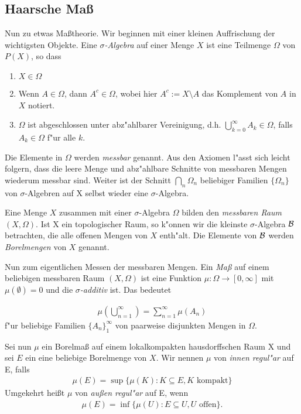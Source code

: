 \subsection{Haarsche Maß}
	Nun zu etwas Maßtheorie. Wir beginnen mit einer kleinen Auffrischung der wichtigsten Objekte. Eine \emph{$\sigma$-Algebra} auf einer Menge $X$ ist eine Teilmenge $\Omega$ von $P(X)$, so dass
	\begin{enumerate}[label=(\roman*)]
		\item $X \in \Omega$
		\item Wenn $A \in \Omega$, dann $A^c \in \Omega$, wobei hier $A^c := X\setminus A$ das Komplement von $A$ in $X$ notiert.
		\item $\Omega$ ist abgeschlossen unter abz"ahlbarer Vereinigung, d.h. $\bigcup_{k=0}^{\infty} A_k \in \Omega$, falls $A_k \in \Omega$ f"ur alle $k$.
	\end{enumerate}
	Die Elemente in $\Omega$ werden \emph{messbar} genannt. Aus den Axiomen l"asst sich leicht folgern, dass die leere Menge und abz"ahlbare Schnitte von messbaren Mengen wiederum messbar sind. Weiter ist der Schnitt $\bigcap_n \Omega_n$ beliebiger Familien $\{\Omega_n\}$ von $\sigma$-Algebren auf X selbst wieder eine $\sigma$-Algebra.
	
	
	Eine Menge $X$ zusammen mit einer $\sigma$-Algebra $\Omega$ bilden den \emph{messbaren Raum} $(X, \Omega)$. Ist X ein topologischer Raum, so k"onnen wir die kleinste $\sigma$-Algebra $\mathcal{B}$ betrachten, die alle offenen Mengen von $X$ enth"alt. Die Elemente von $\mathcal{B}$ werden \emph{Borelmengen} von $X$ genannt.
	
	
	Nun zum eigentlichen Messen der messbaren Mengen. Ein \emph{Maß} auf einem beliebigen messbaren Raum $(X, \Omega)$ ist eine Funktion $\mu: \Omega \to [0, \infty]$ mit $\mu(\emptyset) = 0$ und die \emph{$\sigma$-additiv} ist. Das bedeutet
	
	\begin{align*}
		\mu( \bigcup_{n=1}^{\infty}) = \sum_{n=1}^{\infty} \mu (A_n)
	\end{align*}
	f"ur beliebige Familien $\{A_n\}_1^\infty$ von paarweise disjunkten Mengen in $\Omega$.
	
	
	Sei nun $\mu$ ein Borelmaß auf einem lokalkompakten hausdorffschen Raum X und sei $E$ ein eine beliebige Borelmenge von $X$. Wir nennen $\mu$ von \emph{innen regul"ar} auf E, falls
	\begin{align*}
		\mu(E) = \sup\{\mu(K): K \subseteq E, K \text{ kompakt}\}
	\end{align*}
	Umgekehrt heißt $\mu$ von \emph{außen regul"ar} auf E, wenn
	\begin{align*}
		\mu(E) = \inf\{\mu(U): E \subseteq U, U \text{ offen}\}.
	\end{align*}
	
